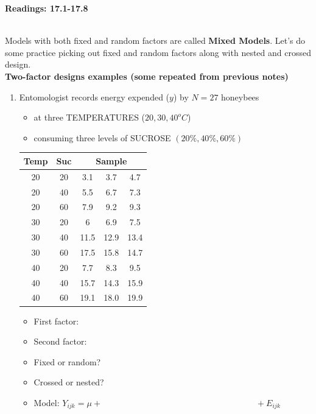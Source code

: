 \begin{center}\large\textbf{Readings: 17.1-17.8}\\
\normalsize \end{center}
\large ~\hrulefill
~\\

Models with both fixed and random factors are called \textbf{Mixed Models}.  Let's do some practice picking out fixed and random factors along with nested and crossed design.\\

\textbf{Two-factor designs examples (some repeated from previous notes)}
\begin{enumerate}
\item Entomologist records energy expended ($y$) by $N=27$ honeybees
\begin{itemize}
\item at three TEMPERATURES ($20,30,40^o C$)
\item consuming three levels of SUCROSE $(20\%,40\%,60\%)$ 
\end{itemize}
 
\begin{large}
\begin{center}
\begin{tabular}{|cc|ccc|}  \hline
Temp & Suc & \multicolumn{3}{c|}{Sample} \\ \hline
   20 & 20 & 3.1 & 3.7 & 4.7 \\
   20 & 40 & 5.5 & 6.7 & 7.3 \\
   20 & 60 & 7.9 & 9.2 & 9.3 \\
   30 & 20 & 6 & 6.9 & 7.5 \\
   30 & 40 & 11.5 & 12.9 & 13.4 \\
   30 & 60 & 17.5 & 15.8 & 14.7 \\
   40 & 20 & 7.7 & 8.3 & 9.5 \\
   40 & 40 & 15.7 & 14.3 & 15.9 \\
   40 & 60 & 19.1 & 18.0 & 19.9 \\ \hline
\end{tabular}
\end{center}
\end{large}

\begin{itemize}
\item First factor: 
\item Second factor: 
\item Fixed or random? 
\item Crossed or nested? 
\item Model:  
$Y_{ijk} = \mu + \hspace{3in} + E_{ijk}$
\end{itemize}



\end{enumerate}
